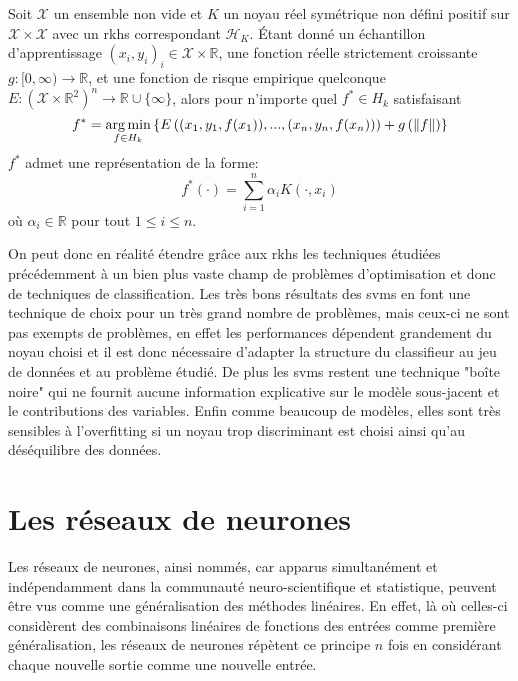\begin{theoreme}
Soit $\mathcal{X}$ un ensemble non vide et $K$ un noyau réel symétrique non défini positif sur $\mathcal{X} \times \mathcal{X}$ avec un \ac{rkhs} correspondant $\mathcal{H}_K$.
Étant donné un échantillon d'apprentissage $(x_i, y_i)_i \in \mathcal{X} \times \mathbb{R}$, une fonction réelle strictement croissante $g \colon [0, \infty) \to \mathbb{R}$, et une fonction de risque empirique quelconque $E \colon (\mathcal{X} \times \mathbb{R}^2)^n \to \mathbb{R} \cup \lbrace \infty \rbrace$, alors pour n'importe quel $f^{*} \in H_k$ satisfaisant
\begin{equation*}
    f^{*} = \operatorname*{arg\,min}_{f \in H_k} \left\{ E\left( (x_1, y_1, f(x_1)), ..., (x_n, y_n, f(x_n)) \right) + g\left( \Vert f \Vert \right) \right\}
\end{equation*}
$f^{*}$ admet une représentation de la forme:
\begin{equation*}
    f^{*}(\cdot) = \sum_{i = 1}^n \alpha_i K(\cdot, x_i)
\end{equation*}
où $\alpha_i \in \mathbb{R}$ pour tout $1 \le i \le n$.
\end{theoreme}

On peut donc en réalité étendre grâce aux \ac{rkhs} les techniques étudiées précédemment à un bien plus vaste champ de problèmes d'optimisation et donc de techniques de classification. Les très bons résultats des \ac{svm}s en font une technique de choix pour un très grand nombre de problèmes, mais ceux-ci ne sont pas exempts de problèmes, en effet les performances dépendent grandement du noyau choisi et il est donc nécessaire d'adapter la structure du classifieur au jeu de données et au problème étudié. De plus les \ac{svm}s restent une technique "boîte noire" qui ne fournit aucune information explicative sur le modèle sous-jacent et le contributions des variables. Enfin comme beaucoup de modèles, elles sont très sensibles à l'overfitting si un noyau trop discriminant est choisi ainsi qu'au déséquilibre des données.

\section{Les réseaux de neurones}

Les réseaux de neurones, ainsi nommés, car apparus simultanément et indépendamment dans la communauté neuro-scientifique et statistique, peuvent être vus comme une généralisation des méthodes linéaires. En effet, là où celles-ci considèrent des combinaisons linéaires de fonctions des entrées comme première généralisation, les réseaux de neurones répètent ce principe $n$ fois en considérant chaque nouvelle sortie comme une nouvelle entrée.

